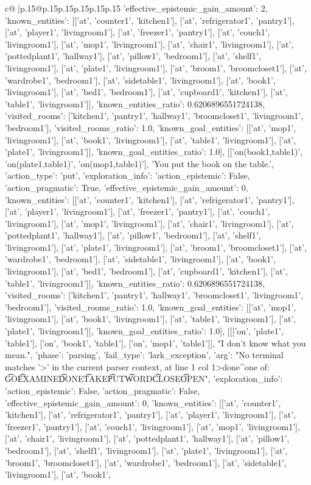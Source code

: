 \documentclass{article}
\begin{document}
{\begin{supertabular}{c@{$\;$}|p{.15\linewidth}@{}p{.15\linewidth}p{.15\linewidth}p{.15\linewidth}p{.15\linewidth}p{.15\linewidth}}
{{{'effective_epistemic_gain_amount': 2, 'known_entities': [['at', 'counter1', 'kitchen1'], ['at', 'refrigerator1', 'pantry1'], ['at', 'player1', 'livingroom1'], ['at', 'freezer1', 'pantry1'], ['at', 'couch1', 'livingroom1'], ['at', 'mop1', 'livingroom1'], ['at', 'chair1', 'livingroom1'], ['at', 'pottedplant1', 'hallway1'], ['at', 'pillow1', 'bedroom1'], ['at', 'shelf1', 'livingroom1'], ['at', 'plate1', 'livingroom1'], ['at', 'broom1', 'broomcloset1'], ['at', 'wardrobe1', 'bedroom1'], ['at', 'sidetable1', 'livingroom1'], ['at', 'book1', 'livingroom1'], ['at', 'bed1', 'bedroom1'], ['at', 'cupboard1', 'kitchen1'], ['at', 'table1', 'livingroom1']], 'known_entities_ratio': 0.6206896551724138, 'visited_rooms': ['kitchen1', 'pantry1', 'hallway1', 'broomcloset1', 'livingroom1', 'bedroom1'], 'visited_rooms_ratio': 1.0, 'known_goal_entities': [['at', 'mop1', 'livingroom1'], ['at', 'book1', 'livingroom1'], ['at', 'table1', 'livingroom1'], ['at', 'plate1', 'livingroom1']], 'known_goal_entities_ratio': 1.0}}], [['on(book1,table1)', 'on(plate1,table1)', 'on(mop1,table1)'], 'You put the book on the table.', {'action_type': 'put', 'exploration_info': {'action_epistemic': False, 'action_pragmatic': True, 'effective_epistemic_gain_amount': 0, 'known_entities': [['at', 'counter1', 'kitchen1'], ['at', 'refrigerator1', 'pantry1'], ['at', 'player1', 'livingroom1'], ['at', 'freezer1', 'pantry1'], ['at', 'couch1', 'livingroom1'], ['at', 'mop1', 'livingroom1'], ['at', 'chair1', 'livingroom1'], ['at', 'pottedplant1', 'hallway1'], ['at', 'pillow1', 'bedroom1'], ['at', 'shelf1', 'livingroom1'], ['at', 'plate1', 'livingroom1'], ['at', 'broom1', 'broomcloset1'], ['at', 'wardrobe1', 'bedroom1'], ['at', 'sidetable1', 'livingroom1'], ['at', 'book1', 'livingroom1'], ['at', 'bed1', 'bedroom1'], ['at', 'cupboard1', 'kitchen1'], ['at', 'table1', 'livingroom1']], 'known_entities_ratio': 0.6206896551724138, 'visited_rooms': ['kitchen1', 'pantry1', 'hallway1', 'broomcloset1', 'livingroom1', 'bedroom1'], 'visited_rooms_ratio': 1.0, 'known_goal_entities': [['at', 'mop1', 'livingroom1'], ['at', 'book1', 'livingroom1'], ['at', 'table1', 'livingroom1'], ['at', 'plate1', 'livingroom1']], 'known_goal_entities_ratio': 1.0}}], [[['on', 'plate1', 'table1'], ['on', 'book1', 'table1'], ['on', 'mop1', 'table1']], "I don't know what you mean.", {'phase': 'parsing', 'fail_type': 'lark_exception', 'arg': "No terminal matches '>' in the current parser context, at line 1 col 1\n\n>done\n^\nExpected one of: \n\t* GO\n\t* EXAMINE\n\t* DONE\n\t* TAKE\n\t* PUT\n\t* WORD\n\t* CLOSE\n\t* OPEN\n", 'exploration_info': {'action_epistemic': False, 'action_pragmatic': False, 'effective_epistemic_gain_amount': 0, 'known_entities': [['at', 'counter1', 'kitchen1'], ['at', 'refrigerator1', 'pantry1'], ['at', 'player1', 'livingroom1'], ['at', 'freezer1', 'pantry1'], ['at', 'couch1', 'livingroom1'], ['at', 'mop1', 'livingroom1'], ['at', 'chair1', 'livingroom1'], ['at', 'pottedplant1', 'hallway1'], ['at', 'pillow1', 'bedroom1'], ['at', 'shelf1', 'livingroom1'], ['at', 'plate1', 'livingroom1'], ['at', 'broom1', 'broomcloset1'], ['at', 'wardrobe1', 'bedroom1'], ['at', 'sidetable1', 'livingroom1'], ['at', 'book1', }}}
\end{supertabular}}
\end{document}
